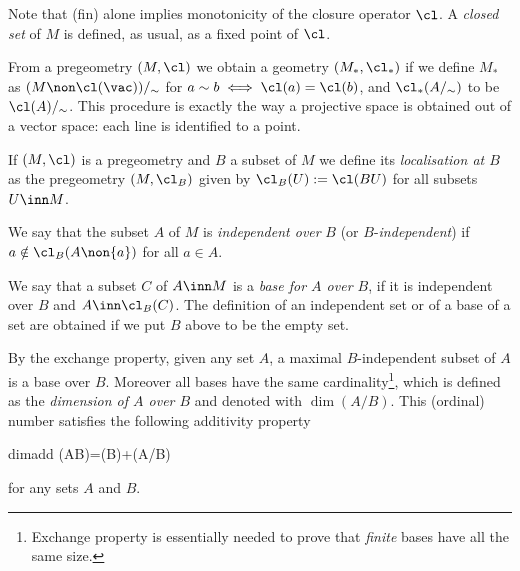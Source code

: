 Note that (fin) alone implies monotonicity %
of the closure operator $\cl$. A {\em closed set} of $M$ is defined, as usual, as a fixed point of $\cl$.
%

\medskip
From a pregeometry $(M,\cl)$ we obtain a geometry $(M_{*},\cl_{*})$ if we define $M_{*}$ as $(M\non\cl(\vac))/_{\sim}$
for $a\sim b\iff\cl(a)=\cl(b)$, and $\cl_{*}(A/_{\sim})$ to be $\cl(A)/_{\sim}$.
This procedure is exactly the way a projective space is obtained out of a vector space:
each line is identified to a point.

\medskip
If $(M,\cl)$ is a pregeometry and $B$ a subset of $M$ we define its {\em localisation at $B$}
as the pregeometry $(M,\cl_{B})$ given by $\cl_{B}(U):=\cl(BU)$ for all subsets $U\inn M$.

\medskip
We say that the subset $A$ of $M$ is {\em independent over} $B$
(or $B$-{\em independent}) if $a\notin\cl_{B}(A\non\{a\})$ for all $a\in A$. 

We say that a subset $C$ of $A\inn M$ is a {\em base for $A$ over $B$}, if it is independent over $B$ and $A\inn\cl_{B}(C)$.
The definition of an independent set or of a base of a set are obtained if we put $B$ above to be the empty set.

By the exchange property, given any set $A$, a maximal $B$-independent subset of $A$ is a base over $B$. Moreover
all bases have the same cardinality\footnote{Exchange property is essentially needed to prove that {\em finite} bases have all the
same size.}, which is defined as the {\em dimension of $A$ over $B$} and denoted
with $\dim(A/B)$. This (ordinal) number satisfies the following additivity property
\begin{labeq}{dimadd}
\dim(AB)=\dim(B)+\dim(A/B)
\end{labeq}
for any sets $A$ and $B$.

